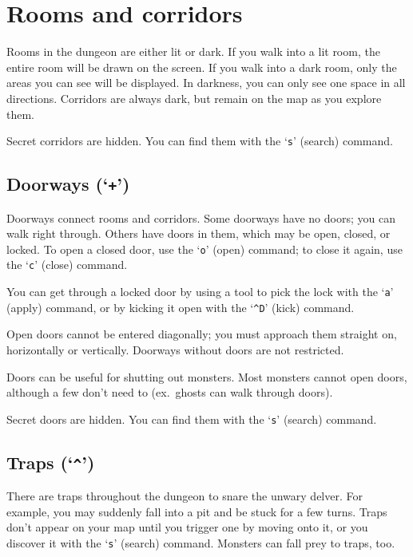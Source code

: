 \section{Rooms and corridors}

Rooms in the dungeon are either lit or dark.  If you walk into a lit
room, the entire room will be drawn on the screen.  If you walk into a
dark room, only the areas you can see will be displayed.  In darkness,
you can only see one space in all directions.  Corridors are always
dark, but remain on the map as you explore them.

Secret corridors are hidden.  You can find them with the `{\tt s}' (search)
command.

\subsection*{Doorways (`{\tt +}')}

Doorways connect rooms and corridors.  Some doorways have no doors;
you can walk right through.  Others have doors in them, which may be
open, closed, or locked.  To open a closed door, use the `{\tt o}' (open)
command; to close it again, use the `{\tt c}' (close) command.

You can get through a locked door by using a tool to pick the lock
with the `{\tt a}' (apply) command, or by kicking it open with the
`{\tt \^{}D}' (kick) command.

Open doors cannot be entered diagonally; you must approach them
straight on, horizontally or vertically.  Doorways without doors are
not restricted.

Doors can be useful for shutting out monsters.  Most monsters cannot
open doors, although a few don't need to (ex.\ ghosts can walk through
doors).

Secret doors are hidden.  You can find them with the `{\tt s}' (search)
command.

\subsection*{Traps (`{\tt \^{}}')}

There are traps throughout the dungeon to snare the unwary delver.
For example, you may suddenly fall into a pit and be stuck for a few
turns.  Traps don't appear on your map until you trigger one by moving
onto it, or you discover it with the `{\tt s}' (search) command.  Monsters
can fall prey to traps, too.

